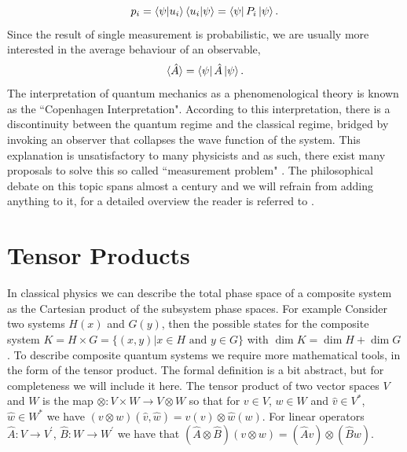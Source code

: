 \begin{equation*}
    p_i = \braket{\psi}{u_i}\braket{u_i}{\psi} = \bra{\psi} P_i \ket{\psi}.
\end{equation*}
Since the result of single measurement is probabilistic, we are usually more interested in the average behaviour of an observable,
\begin{equation*}
    \langle \hat{A}\rangle = \bra{\psi} \hat{A} \ket{\psi}.
\end{equation*}
The interpretation of quantum mechanics as a phenomenological theory is known as the ``Copenhagen Interpretation". According to this interpretation, there is a discontinuity between the quantum regime and the classical regime, bridged by invoking an observer that collapses the wave function of the system. This explanation is unsatisfactory to many physicists and as such, there exist many proposals to solve this so called ``measurement problem" \cite{Schlosshauer2005}. The philosophical debate on this topic spans almost a century and we will refrain from adding anything to it, for a detailed overview the reader is referred to \cite{Myrvold2018}.

\section{Tensor Products}\label{sec:tens_prod}

In classical physics we can describe the total phase space of a composite system as the Cartesian product of the subsystem phase spaces. For example Consider two systems $H(x)$ and $G(y)$, then the possible states for the composite system $K = H \times G = \{(x,y) | x\in H \text{ and } y\in G\}$ with $\dim K = \dim H + \dim G$. To describe composite quantum systems we require more mathematical tools, in the form of the tensor product. The formal definition is a bit abstract, but for completeness we will include it here. The tensor product of two vector spaces $V$ and $W$ is the map $\otimes: V\times W\rightarrow V\otimes W$ so that for $v\in V$, $w\in W$ and $\hat{v}\in V^*$, $\hat{w}\in W^*$ we have $(v\otimes w)(\hat{v},\hat{w}) = \hat{v}(v) \otimes \hat{w}(w)$. For linear operators $\hat{A}:V\rightarrow V^\prime$, $\hat{B}:W\rightarrow W^\prime$ we have that $(\hat{A}\otimes\hat{B})(v\otimes w) = (\hat{A}v)\otimes (\hat{B}w)$. \newline

